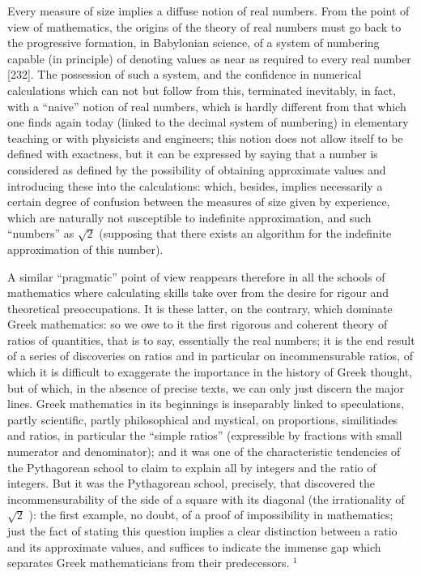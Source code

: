 Every measure of size implies a diffuse notion of real numbers. From the point of view of mathematics, the origins of the theory of real numbers must go back to the progressive formation, in Babylonian science, of a system of numbering capable (in principle) of denoting values as near as required to every real number {[}232{]}. The possession of such a system, and the confidence in numerical calculations which can not but follow from this, terminated inevitably, in fact, with a ``naive'' notion of real numbers, which is hardly different from that which one finds again today (linked to the decimal system of numbering) in elementary teaching or with physicists and engineers; this notion does not allow itself to be defined with exactness, but it can be expressed by saying that a number is considered as defined by the possibility of obtaining approximate values and introducing these into the calculations: which, besides, implies necessarily a certain degree of confusion between the measures of size given by experience, which are naturally not susceptible to indefinite approximation, and such ``numbers'' as \(\sqrt{2}\) (supposing that there exists an algorithm for the indefinite approximation of this number).

A similar ``pragmatic'' point of view reappears therefore in all the schools of mathematics where calculating skills take over from the desire for rigour and theoretical preoccupations. It is these latter, on the contrary, which dominate Greek mathematics: so we owe to it the first rigorous and coherent theory of ratios of quantities, that is to say, essentially the real numbers; it is the end result of a series of discoveries on ratios and in particular on incommensurable ratios, of which it is difficult to exaggerate the importance in the history of Greek thought, but of which, in the absence of precise texts, we can only just discern the major lines. Greek mathematics in its beginnings is inseparably linked to speculations, partly scientific, partly philosophical and mystical, on proportions, similitiades and ratios, in particular the ``simple ratios'' (expressible by fractions with small numerator and denominator); and it was one of the characteristic tendencies of the Pythagorean school to claim to explain all by integers and the ratio of integers. But it was the Pythagorean school, precisely, that discovered the incommensurability of the side of a square with its diagonal (the irrationality of \(\sqrt{2}\) ): the first example, no doubt, of a proof of impossibility in mathematics; just the fact of stating this question implies a clear distinction between a ratio and its approximate values, and suffices to indicate the immense gap which separates Greek mathematicians from their predecessors. \(^{1}\)


